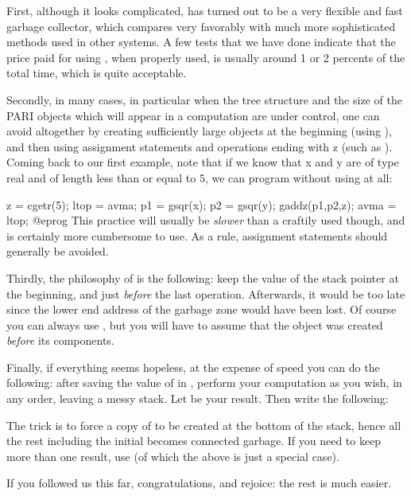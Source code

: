 First, although it looks complicated,  has turned out to be a
very flexible and fast garbage collector, which compares very favorably
with much more sophisticated methods used in other systems. A few tests that
we have done indicate that the price paid for using , when
properly used, is usually around 1 or 2 percents of the total time, which is
quite acceptable.

Secondly, in many cases, in particular when the tree structure and the size of
the PARI objects which will appear in a computation are under control, one
can avoid  altogether by creating sufficiently large objects at
the beginning (using ), and then using assignment statements and
operations ending with z (such as ). Coming back to our first
example, note that if we know that x and y are of type real and of length
less than or equal to 5, we can program without using  at all:

\bprog
  z = cgetr(5); ltop = avma;
  p1 = gsqr(x); p2 = gsqr(y); gaddz(p1,p2,z);
  avma = ltop;
@eprog
\noindent This practice will usually be {\it slower\/} than a craftily used
 though, and is certainly more cumbersome to use. As a rule,
assignment statements should generally be avoided.
\smallskip

Thirdly, the philosophy of  is the following: keep the value of
the stack pointer  at the beginning, and just {\it before\/} the
last operation.  Afterwards, it would be too late since the lower end address
of the garbage zone would have been lost. Of course you can always use
, but you will have to assume that the object was created
{\it before\/} its components.

Finally, if everything seems hopeless, at the expense of speed you can do the
following: after saving the value of  in , perform your
computation as you wish, in any order, leaving a messy stack. Let  be
your result. Then write the following:


\noindent
The trick is to force a copy of  to be created at the bottom of the
stack, hence all the rest including the initial  becomes connected
garbage. If you need to keep more than one result, use 
(of which the above is just a special case).

\smallskip If you followed us this far, congratulations, and rejoice: the
rest is much easier.

